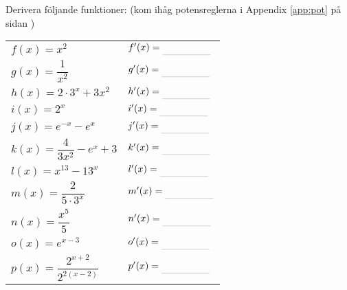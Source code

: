 \documentclass[a4paper, 12pt]{article}
\begin{document}
\newpage

\begin{blu}
    Derivera följande funktioner: (kom ihåg potensreglerna i Appendix \ref*{app:pot} på sidan \pageref*{app:pot})
    
    \begin{itemize}
        \begin{tabular}[b]{p{10em} p{20em}}
            \item $f(x) = x^2$  & \item[] $ f'(x) \ans $ \\
            \item $g(x) = \dfrac{1}{x^2} $ & \item[] $g'(x) \ans$ \\
            \item $h(x) = 2\cdot 3^x + 3x^2 $ & \item[] $h'(x) \ans$ \\
            \item $i(x) = 2^x $ & \item[] $i'(x) \ans$\\
            \item $j(x) = e^{-x} - e^x $ & \item[] $j'(x) \ans$\\
            \item $k(x) = \dfrac{4}{3x^2}-e^x + 3 $ & \item[] $k'(x) \ans$\\
            \item $l(x) = x^{13} - 13^x $ & \item[] $ l'(x) \ans$ \\
            \item $m(x) = \dfrac{2}{5\cdot 3^x} $ & \item[] $ m'(x) \ans$ \\
            \item $n(x) = \dfrac{x^5}{5} $ & \item[] $ n'(x) \ans$ \\
            \item $o(x) = e^{x-3} $ & \item[] $ o'(x) \ans$ \\
            \item $p(x) = \dfrac{2^{x+2}}{2^{2(x-2)}}$ & \item[] $ p'(x) \ans$ \\
        \end{tabular}
    
    \end{itemize}
    
\end{blu}
\end{document}
